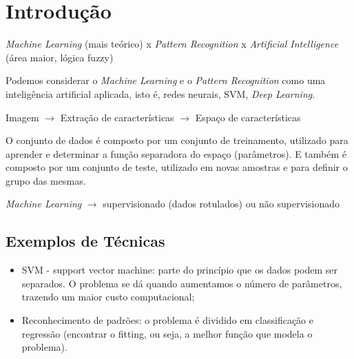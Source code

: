 \section{Introdução}
\label{s.introducao}

\begin{center}
\emph{Machine Learning} (mais teórico) x \emph{Pattern Recognition} x \emph{Artificial Intelligence} (área maior, lógica fuzzy)
\end{center}

Podemos considerar o \emph{Machine Learning} e o \emph{Pattern Recognition} como uma inteligência artificial aplicada, isto é, redes neurais, SVM, \emph{Deep Learning}.

\begin{center}
Imagem $\longrightarrow$ Extração de características $\longrightarrow$ Espaço de características	
\end{center}

O conjunto de dados é composto por um conjunto de treinamento, utilizado para aprender e determinar a função separadora do espaço (parâmetros). E também é composto por um conjunto de teste, utilizado em novas amostras e para definir o grupo das mesmas.

\begin{center}
\emph{Machine Learning} $\longrightarrow$ supervisionado (dados rotulados) ou não supervisionado
\end{center}

\subsection{Exemplos de Técnicas}
\label{ss.tecnicas}

\begin{itemize}
	\item SVM - support vector machine: parte do princípio que os dados podem ser separados. O problema se dá quando aumentamos o número de parâmetros, trazendo um maior custo computacional;

	\item Reconhecimento de padrões: o problema é dividido em classificação e regressão (encontrar o fitting, ou seja, a melhor função que modela o problema).	
\end{itemize}
